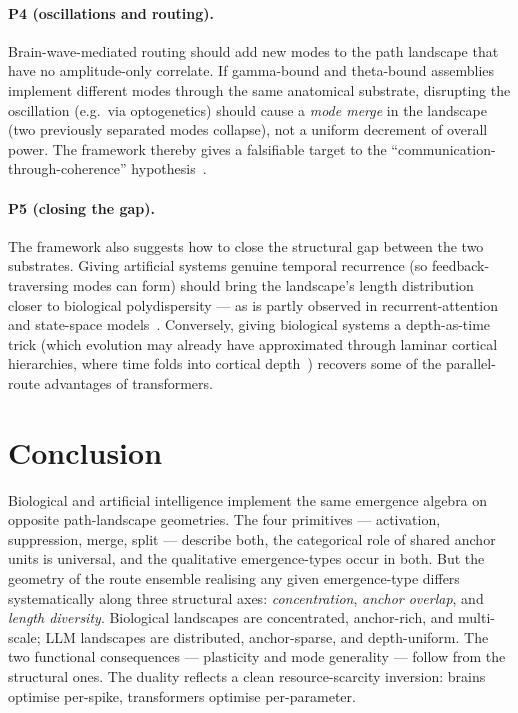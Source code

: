 \documentclass[11pt,a4paper]{article}
\begin{document}
\paragraph{P4 (oscillations and routing).} Brain-wave-mediated
routing should add new modes to the path landscape that have no
amplitude-only correlate. If gamma-bound and theta-bound assemblies
implement different modes through the same anatomical substrate,
disrupting the oscillation (e.g.\ via optogenetics) should cause a
\emph{mode merge} in the landscape (two previously separated modes
collapse), not a uniform decrement of overall power. The framework
thereby gives a falsifiable target to the
``communication-through-coherence''
hypothesis~\cite{fries2005communication,fries2015rhythms}.

\paragraph{P5 (closing the gap).} The framework also suggests how to
close the structural gap between the two substrates. Giving
artificial systems genuine temporal recurrence (so feedback-traversing
modes can form) should bring the landscape's length distribution closer
to biological polydispersity --- as is partly observed in
recurrent-attention and state-space
models~\cite{gu2022efficiently,beck2024xlstm}. Conversely, giving
biological systems a depth-as-time trick (which evolution may already
have approximated through laminar cortical hierarchies, where time
folds into cortical
depth~\cite{douglas2004canonical,markov2014cortical}) recovers
some of the parallel-route advantages of transformers.

\section{Conclusion}\label{sec:conc}

Biological and artificial intelligence implement the same emergence
algebra on opposite path-landscape geometries. The four primitives
--- activation, suppression, merge, split --- describe both, the
categorical role of shared anchor units is universal, and the
qualitative emergence-types occur in both. But the geometry of the
route ensemble realising any given emergence-type differs
systematically along three structural axes: \emph{concentration},
\emph{anchor overlap}, and \emph{length diversity}. Biological
landscapes are concentrated, anchor-rich, and multi-scale; LLM
landscapes are distributed, anchor-sparse, and depth-uniform. The
two functional consequences --- plasticity and mode generality ---
follow from the structural ones. The duality reflects a clean
resource-scarcity inversion: brains optimise per-spike, transformers
optimise per-parameter.
\end{document}
